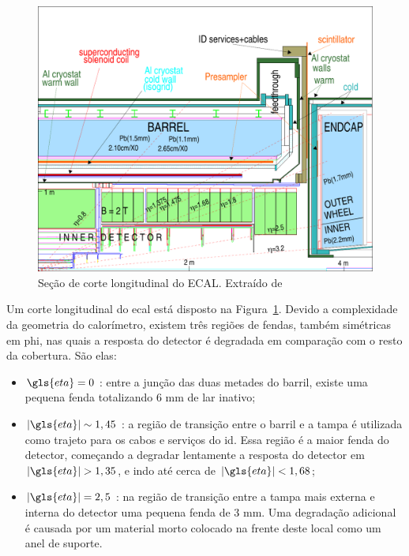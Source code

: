 \begin{figure}
\centering
\includegraphics{imagens/calorimetros_secao.pdf}
\caption[Seção de corte longitudinal do ECAL]
{Seção de corte longitudinal do ECAL. Extraído de
\cite{cal_tdr}}
\label{fig:secao_em_calo}
\end{figure}

Um corte longitudinal do \gls{ecal} está disposto na
Figura~\ref{fig:secao_em_calo}. Devido a complexidade da geometria do
calorímetro, existem três regiões de fendas, também simétricas em \gls{phi}, 
nas quais a resposta do detector é degradada em comparação com o resto 
da cobertura. São elas:

\begin{itemize}
\item $\gls{eta}=0$ : entre a junção das duas metades do barril, existe uma 
pequena fenda totalizando 6 mm de \gls{lar} inativo;
\item $|\gls{eta}|\sim1,45$ : a região de transição entre o barril e a tampa é
utilizada como trajeto para os cabos e serviços do \gls{id}. Essa região é a
maior fenda do detector, começando a degradar lentamente a resposta do detector em
$|\gls{eta}|>1,35$, e indo até cerca de $|\gls{eta}|<1,68$;
\item $|\gls{eta}|=2,5$ : na região de transição entre a tampa mais externa e
interna do detector uma pequena fenda de 3 mm. Uma degradação adicional é
causada por um material morto colocado na frente deste local como um anel de
suporte.
\end{itemize}

